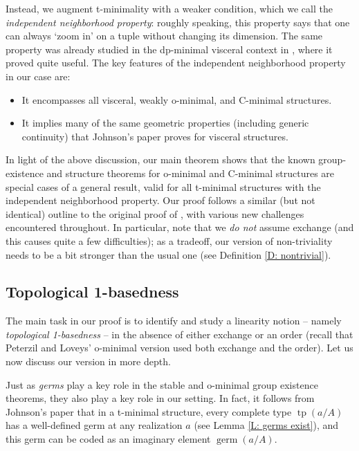 \documentclass{amsart}
\theoremstyle{definition}
\newcommand{\tp}{\operatorname{tp}}
\begin{document}
Instead, we augment t-minimality with a weaker condition, which we call the \textit{independent neighborhood property}: roughly speaking, this property says that one can always `zoom in' on a tuple without changing its dimension. The same property was already studied in the dp-minimal visceral context in \cite{HaHaPeVF}, where it proved quite useful. The key features of the independent neighborhood property in our case are:

\begin{itemize}
    \item It encompasses all visceral, weakly o-minimal, and C-minimal structures.
    \item It implies many of the same geometric properties (including generic continuity) that Johnson's paper proves for visceral structures.
\end{itemize}

In light of the above discussion, our main theorem shows that the known group-existence and structure theorems for o-minimal and C-minimal structures are special cases of a general result, valid for all t-minimal structures with the independent neighborhood property. Our proof follows a similar (but not identical) outline to the original proof of \cite{Pe}, with various new challenges encountered throughout. In particular, note that we \textit{do not} assume exchange (and this causes quite a few difficulties); as a tradeoff, our version of non-triviality needs to be a bit stronger than the usual one (see Definition \ref{D: nontrivial}).

\subsection{Topological 1-basedness}

The main task in our proof is to identify and study a linearity notion -- namely \textit{topological 1-basedness} -- in the absence of either exchange or an order (recall that Peterzil and Loveys' o-minimal version used both exchange and the order). Let us now discuss our version in more depth. 

Just as \textit{germs} play a key role in the stable and o-minimal group existence theorems, they also play a key role in our setting. In fact, it follows from Johnson's paper that in a t-minimal structure, every complete type $\tp(a/A)$ has a well-defined germ at any realization $a$ (see Lemma \ref{L: germs exist}), and this germ can be coded as an imaginary element $\operatorname{germ}(a/A)$.
\end{document}
